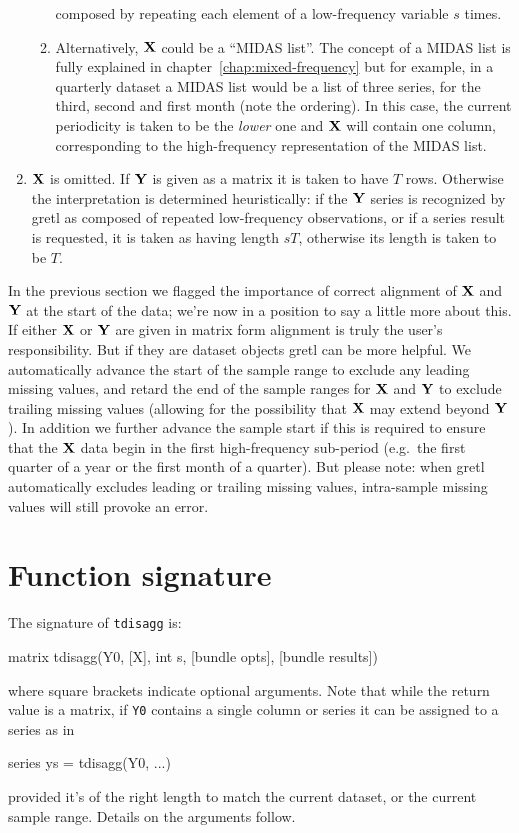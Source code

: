 \begin{enumerate}
\begin{enumerate}
    composed by repeating each element of a low-frequency variable $s$
    times.
  \item Alternatively, $\mathbf{X}$ could be a ``MIDAS list''. The concept of
    a MIDAS list is fully explained in
    chapter~\ref{chap:mixed-frequency} but for example, in a quarterly
    dataset a MIDAS list would be a list of three series, for the
    third, second and first month (note the ordering). In this case,
    the current periodicity is taken to be the \emph{lower} one and
    $\mathbf{X}$ will contain one column, corresponding to the high-frequency
    representation of the MIDAS list.
  \end{enumerate}
\item $\mathbf{X}$ is omitted. If $\mathbf{Y}$ is given as a matrix it is taken to
  have $T$ rows. Otherwise the interpretation is determined
  heuristically: if the $\mathbf{Y}$ series is recognized by gretl as
  composed of repeated low-frequency observations, or if a series
  result is requested, it is taken as having length $sT$, otherwise
  its length is taken to be $T$.
\end{enumerate}

In the previous section we flagged the importance of correct alignment
of $\mathbf{X}$ and $\mathbf{Y}$ at the start of the data; we're now in a position
to say a little more about this. If either $\mathbf{X}$ or $\mathbf{Y}$ are given in
matrix form alignment is truly the user's responsibility. But if they
are dataset objects gretl can be more helpful. We automatically
advance the start of the sample range to exclude any leading missing
values, and retard the end of the sample ranges for $\mathbf{X}$ and $\mathbf{Y}$ to
exclude trailing missing values (allowing for the possibility that
$\mathbf{X}$ may extend beyond $\mathbf{Y}$). In addition we further advance the
sample start if this is required to ensure that the $\mathbf{X}$ data begin
in the first high-frequency sub-period (e.g.\ the first quarter of a
year or the first month of a quarter). But please note: when gretl
automatically excludes leading or trailing missing values,
intra-sample missing values will still provoke an error.

\section{Function signature}
\label{sec:tdisagg-sig}

The signature of \texttt{tdisagg} is:
\begin{code}
matrix tdisagg(Y0, [X], int s, [bundle opts], [bundle results])
\end{code}
where square brackets indicate optional arguments. Note that while the
return value is a matrix, if \texttt{Y0} contains a single column or
series it can be assigned to a series as in
\begin{code}
series ys = tdisagg(Y0, ...)
\end{code}
provided it's of the right length to match the current dataset, or the
current sample range. Details on the arguments follow.

